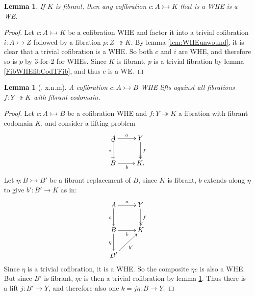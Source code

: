 \documentclass[12pt]{article}
\newcommand{\mono}{\ensuremath{\rightarrowtail}}
\newcommand{\ra}{\ensuremath{\rightarrow}}
\newcommand{\onto}{\ensuremath{\twoheadrightarrow}}
\newtheorem{lemma}[theorem]{Lemma}
\theoremstyle{remark}
\theoremstyle{definition}
\begin{document}
\begin{lemma}\label{CofWHEfibCodTCof}
If $K$ is fibrant, then any cofibration $c : A \mono K$ that is a WHE is a WE.
\end{lemma}
\begin{proof}
Let $c : A \mono K$ be a cofibration WHE and factor it into a trivial cofibration $i : A\mono Z$ followed by a fibration $p: Z\onto K$.  By lemma \ref{lem:WHEunwound}, it is clear that a trivial cofibration is a WHE.  So both 
$c$ and $i$ are WHE, and therefore so is $p$ by 3-for-2 for WHEs.   Since $K$ is fibrant, $p$ is a trivial fibration by lemma \ref{FibWHEfibCodTFib}, and thus $c$ is a WE.  
\end{proof}

\begin{lemma}[\cite{Cisinski:??}, x.n.m]\label{lemma:CofWHEiffFibLift}
A cofibration $ c : A \mono B$ WHE lifts against all fibrations $f : Y\onto K$ with fibrant codomain.
\end{lemma}
%
\begin{proof}
Let $c : A\mono B$ be a cofibration WHE and  $f : Y\onto K$ a fibration with fibrant codomain $K$, and consider a lifting problem
\begin{equation*}%
\xymatrix{
A \ar@{>->}[d]_{c} \ar[r]^-{a}  & Y \ar@{>>}[d]^{f} \\
B \ar[r]_{b} &  K.
}
\end{equation*}
Let $\eta : B\mono B'$ be a fibrant replacement of $B$, since $K$ is fibrant, $b$ extends along $\eta$ to give $b' : B'\ra K$ as in:   
\begin{equation*}%
\xymatrix{
A \ar@{>->}[d]_{c} \ar[r]^-{a}  & Y \ar@{>>}[d]^{f} \\
B \ar[r]_{b} \ar[d]_\eta &  K\\
B' \ar[ru]_{b'} & 
}
\end{equation*}
Since $\eta$ is a trivial cofibration, it is a WHE. So the composite $\eta c$ is also a WHE.  But since $B'$ is fibrant, $\eta c$ is then a trivial cofibration by lemma \ref{CofWHEfibCodTCof}.  Thus there is a lift $j : B'\ra Y$, and therefore also one $k = j\eta : B\ra Y$. 
%
\end{proof}
\end{document}
